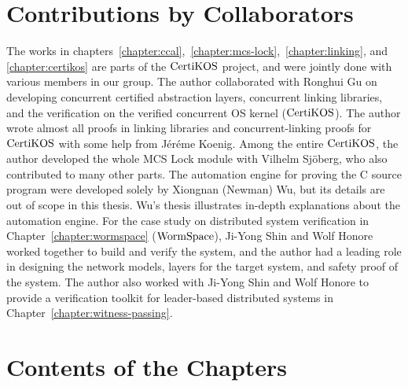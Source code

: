 \section{Contributions by Collaborators}
\label{chapter:introduction:sec:contributions-by-collaborators}

The works in chapters~\ref{chapter:ccal},~\ref{chapter:mcs-lock},~\ref{chapter:linking}, and \ref{chapter:certikos} are parts of 
the $\mathrm{CertiKOS}$ project, and were jointly done with various members in our group.
The author collaborated with Ronghui Gu on developing concurrent certified abstraction layers, concurrent linking libraries, and the verification on the verified concurrent OS kernel ($\mathrm{CertiKOS}$).  
The author wrote almost all proofs in linking libraries and concurrent-linking proofs for $\mathrm{CertiKOS}$ with some help from 
J{\'e}r{\'e}me Koenig.
Among the entire $\mathrm{CertiKOS}$, 
the author developed the whole MCS Lock module with Vilhelm Sj{\"o}berg,
who also contributed to many other parts. The automation engine for proving the C source program were developed solely by Xiongnan (Newman) Wu,
 but its details are out of scope in this thesis. Wu’s thesis illustrates in-depth explanations about the automation engine. 
 For the case study on distributed system verification in Chapter~\ref{chapter:wormspace} ($\mathrm{WormSpace}$), Ji-Yong Shin and Wolf Honore 
 worked together to build and verify the system, and the author had a leading role in designing the network models, 
 layers for the target system, and safety proof of the system.
 The author also worked with Ji-Yong Shin and Wolf Honore to provide a verification toolkit for leader-based distributed systems 
 in Chapter~\ref{chapter:witness-passing}.

\section{Contents of the Chapters}
\label{chapter:introduction:sec:contents-of-the-chapters}

